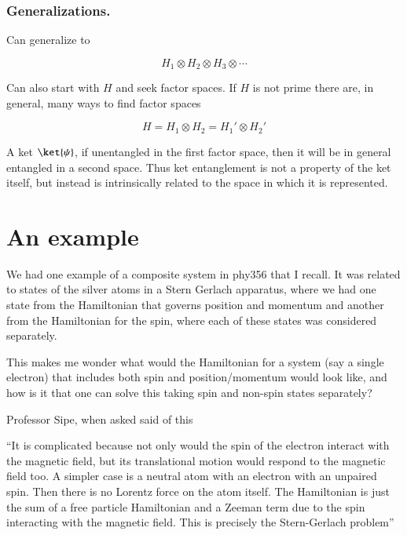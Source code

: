 \subsubsection{Generalizations.}

Can generalize to 

\begin{equation}\label{eqn:qmTwoL1:370}
H_1 \otimes H_2 \otimes H_3 \otimes \cdots
\end{equation}

Can also start with $H$ and seek factor spaces.  If $H$ is not prime there are, in general, many ways to find factor spaces

\begin{equation}\label{eqn:qmTwoL1:390}
H = 
H_1 \otimes H_2 =
H_1' \otimes H_2'
\end{equation}

A ket $\ket{\psi}$, if unentangled in the first factor space, then it will be in general entangled in a second space.  Thus ket entanglement is not a property of the ket itself, but instead is intrinsically related to the space in which it is represented.

\section{An example}

We had one example of a composite system in phy356 that I recall.
It was related to states of the silver atoms in a Stern Gerlach
apparatus, where we had one state from the Hamiltonian that governs
position and momentum and another from the Hamiltonian for the spin,
where each of these states was considered separately.

This makes me wonder what would the Hamiltonian for a system (say a single
electron) that includes both spin and position/momentum would look
like, and how is it that one can solve this taking spin and non-spin
states separately?

Professor Sipe, when asked said of this

``It is complicated because not only would the spin of the electron interact with the magnetic field, but its translational motion would respond to the magnetic field too.  A simpler case is a neutral atom with an electron with an unpaired spin.  Then there is no Lorentz force on the atom itself.  The Hamiltonian is just the sum of a free particle Hamiltonian and a Zeeman term due to the spin interacting with the magnetic field.  This is precisely the Stern-Gerlach problem''

